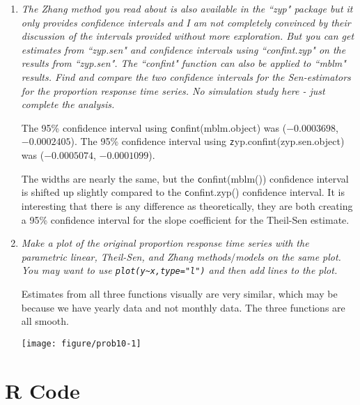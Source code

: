 \documentclass[11pt]{article}\usepackage[]{graphicx}\usepackage[]{color}
\makeatletter
\def\maxwidth{ %
  \ifdim\Gin@nat@width>\linewidth
    \linewidth
  \else
    \Gin@nat@width
  \fi
}
\newenvironment{knitrout}{}{} %
\makeatother
\begin{document}
\begin{enumerate}
\item%
{\it The Zhang method you read about is also available in the ``zyp" package but it only provides confidence intervals and I am not completely convinced by their discussion of the intervals provided without more exploration. But you can get estimates from ``zyp.sen" and confidence intervals using ``confint.zyp" on the results from ``zyp.sen". The ``confint" function can also be applied to ``mblm" results. Find and compare the two confidence intervals for the Sen-estimators for the proportion response time series. No simulation study here - just complete the analysis.}





The 95\% confidence interval using {\texttt confint(mblm.object)} was (\ensuremath{-0.0003698}, \ensuremath{-0.0002405}).
The 95\% confidence interval using {\texttt zyp.confint(zyp.sen.object)} was (\ensuremath{-0.0005074}, \ensuremath{-0.0001099}).

The widths are nearly the same, but the {\texttt confint(mblm())} confidence interval is shifted up slightly compared to the {\texttt confint.zyp()} confidence interval. It is interesting that there is any difference as theoretically, they are both creating a 95\% confidence interval for the slope coefficient for the Theil-Sen estimate.


\item%
{\it Make a plot of the original proportion response time series with the parametric linear, Theil-Sen, and Zhang methods$/$models on the same plot. You may want to use \verb|plot(y~x,type="l")| and then add lines to the plot.}

Estimates from all three functions visually are very similar, which may be because we have yearly data and not monthly data. The three functions are all smooth.


\begin{knitrout}\footnotesize
{}\color{fgcolor}

{\centering \texttt{[image: figure/prob10-1]} 

}



\end{knitrout}



\end{enumerate}

\appendix
\section*{R Code}
\end{document}
